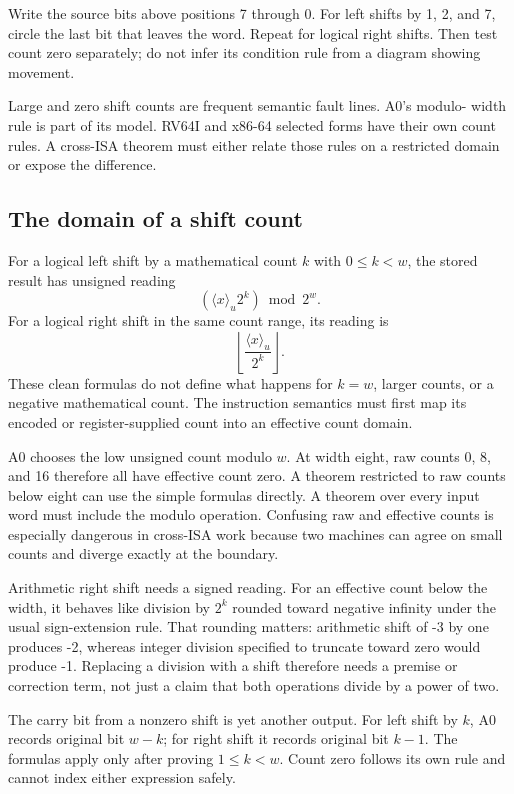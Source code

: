 \begin{tryit}[title={Follow the bit that becomes carry}]
Write the source bits above positions 7 through 0. For left shifts by 1, 2,
and 7, circle the last bit that leaves the word. Repeat for logical right
shifts. Then test count zero separately; do not infer its condition rule from
a diagram showing movement.
\end{tryit}

Large and zero shift counts are frequent semantic fault lines. A0's modulo-
width rule is part of its model. RV64I and x86-64 selected forms have their own
count rules. A cross-ISA theorem must either relate those rules on a restricted
domain or expose the difference.

\subsection{The domain of a shift count}

For a logical left shift by a mathematical count \(k\) with
\(0\leq k<w\), the stored result has unsigned reading
\[
  (\langle x\rangle_u2^k)\bmod 2^w.
\]
For a logical right shift in the same count range, its reading is
\[
  \left\lfloor\frac{\langle x\rangle_u}{2^k}\right\rfloor.
\]
These clean formulas do not define what happens for \(k=w\), larger counts,
or a negative mathematical count. The instruction semantics must first map
its encoded or register-supplied count into an effective count domain.

A0 chooses the low unsigned count modulo \(w\). At width eight, raw counts
0, 8, and 16 therefore all have effective count zero. A theorem restricted to
raw counts below eight can use the simple formulas directly. A theorem over
every input word must include the modulo operation. Confusing raw and
effective counts is especially dangerous in cross-ISA work because two
machines can agree on small counts and diverge exactly at the boundary.

Arithmetic right shift needs a signed reading. For an effective count below
the width, it behaves like division by \(2^k\) rounded toward negative
infinity under the usual sign-extension rule. That rounding matters:
arithmetic shift of -3 by one produces -2, whereas integer division specified
to truncate toward zero would produce -1. Replacing a division with a shift
therefore needs a premise or correction term, not just a claim that both
operations divide by a power of two.

The carry bit from a nonzero shift is yet another output. For left shift by
\(k\), A0 records original bit \(w-k\); for right shift it records original
bit \(k-1\). The formulas apply only after proving \(1\leq k<w\). Count
zero follows its own rule and cannot index either expression safely.

